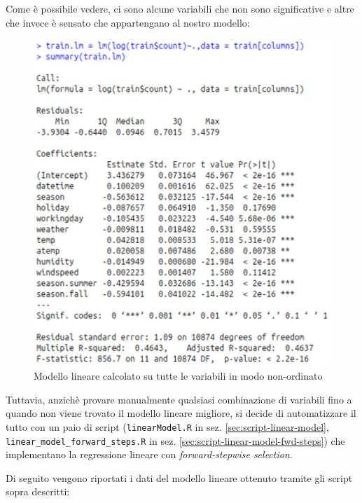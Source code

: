 Come è possibile vedere, ci sono alcune variabili che non sono significative e
altre che invece è sensato che appartengano al nostro modello:

\begin{figure}[H]
  \centering
  \includegraphics[width=.55\columnwidth]{images/lm-with-all-vars.eps}
  \caption{Modello lineare calcolato su tutte le variabili in modo
    non-ordinato}\label{fig:simpl-lm-log-qqplot}
\end{figure}

Tuttavia, anzichè provare manualmente qualsiasi combinazione di variabili
fino a quando non viene trovato il modello lineare migliore, si decide di
automatizzare il tutto con un paio di script (\texttt{linearModel.R} in sez.
\ref{sec:script-linear-model}, \texttt{linear\_model\_forward\_steps.R} in
sez. \ref{sec:script-linear-model-fwd-steps}) che implementano la regressione
lineare con \emph{forward-stepwise selection}.

Di seguito vengono riportati i dati del modello lineare ottenuto tramite gli
script sopra descritti:

